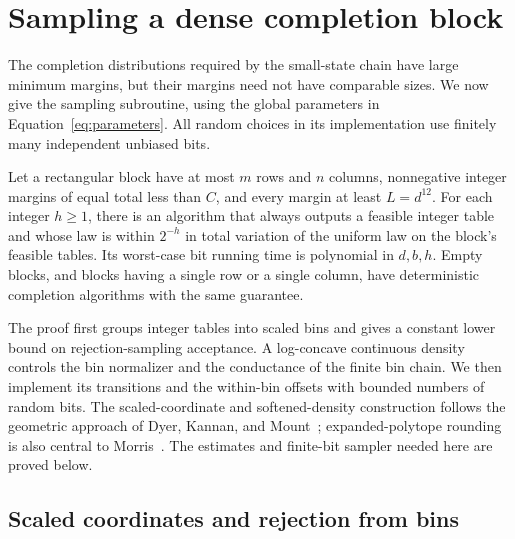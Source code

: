 \section{Sampling a dense completion block}\label{sec:dense}

The completion distributions required by the small-state chain have large
minimum margins, but their margins need not have comparable sizes.  We now
give the sampling subroutine, using the global parameters in
Equation~\eqref{eq:parameters}.  All random choices in its implementation
use finitely many independent unbiased bits.

\begin{theorem}\label{thm:dense-draw}
Let a rectangular block have at most $m$ rows and $n$ columns, nonnegative
integer margins of equal total less than $C$, and every margin at least
$L=d^{12}$.  For each integer $h\ge1$, there is an algorithm that always
outputs a feasible integer table and whose law is within $2^{-h}$ in
total variation of the uniform law on the block's feasible tables.
Its worst-case bit running time is polynomial in $d,b,h$.  Empty blocks,
and blocks having a single row or a single column, have deterministic
completion algorithms with the same guarantee.
\end{theorem}

The proof first groups integer tables into scaled bins and gives a
constant lower bound on rejection-sampling acceptance. A log-concave
continuous density controls the bin normalizer and the conductance of the
finite bin chain. We then implement its transitions and the within-bin offsets
with bounded numbers of random bits.
The scaled-coordinate and softened-density construction follows the
geometric approach of Dyer, Kannan, and Mount~\cite[Sections~4--5]{DKM1997};
expanded-polytope rounding is also central to Morris~\cite[Sections~1.3--2]{Morris2002}.
The estimates and finite-bit sampler needed here are proved below.

\subsection{Scaled coordinates and rejection from bins}


